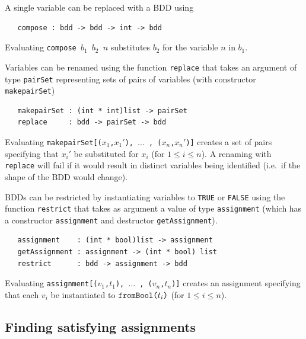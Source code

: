 \documentclass[12pt,fleqn]{article}
\renewcommand{\t}[1]{\mbox{\tt #1}}
\begin{document}
A single variable can be replaced with a BDD using

\begin{verbatim}
   compose : bdd -> bdd -> int -> bdd
\end{verbatim}

Evaluating \t{compose~$b_1$~$b_2$~$n$} substitutes $b_2$ for the
variable $n$ in $b_1$.

Variables can be renamed using the function \t{replace} that takes
an argument of type \t{pairSet} representing sets of pairs of variables
(with constructor \t{makepairSet})

\begin{verbatim}
   makepairSet : (int * int)list -> pairSet
   replace     : bdd -> pairSet -> bdd
\end{verbatim}

Evaluating \t{makepairSet[($x_1$,$x_1'$), $\ldots$ , ($x_n$,$x_n'$)]}
creates a set of pairs specifying that $x_i'$ be substituted for $x_i$
(for $1\leq i\leq n$).  A renaming with \t{replace} will fail if it
would result in distinct variables being identified (i.e.~if the shape of the BDD would change).

BDDs can be restricted by instantiating variables to {\t{TRUE}} or
{\t{FALSE}} using the function \t{restrict} that takes
as argument a value of type \t{assignment}
(which has a constructor \t{assignment} and destructor \t{getAssignment}).

\begin{verbatim}
   assignment    : (int * bool)list -> assignment
   getAssignment : assignment -> (int * bool) list
   restrict      : bdd -> assignment -> bdd
\end{verbatim}

\noindent Evaluating \t{assignment[($v_1$,$t_1$), $\ldots$ , ($v_n$,$t_n$)]}
creates an assignment specifying that each $v_i$ be instantiated to
$\t{fromBool(}t_i\t{)}$ (for $1{\leq}i{\leq}n$).


\subsection{Finding satisfying assignments}
\end{document}
